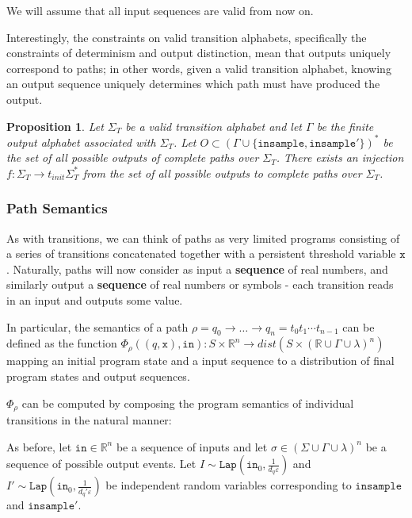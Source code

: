 \documentclass[12pt]{article}
\newcommand{\RR}{\mathbb{R}}
\newcommand{\Lap}{\texttt{Lap}}
\newtheorem{prop}[thm]{Proposition}
\theoremstyle{definition}
\begin{document}
We will assume that all input sequences are valid from now on. 

Interestingly, the constraints on valid transition alphabets, specifically the constraints of determinism and output distinction, mean that outputs uniquely correspond to paths; in other words, given a valid transition alphabet, knowing an output sequence uniquely determines which path must have produced the output. 

\begin{prop}
    Let $\Sigma_T$ be a valid transition alphabet and let $\Gamma$ be the finite output alphabet associated with $\Sigma_T$. Let $O\subset (\Gamma\cup\{\texttt{insample}, \texttt{insample}'\})^*$ be the set of all possible outputs of complete paths over $\Sigma_T$. There exists an injection $f: \Sigma_T\to t_{init}\Sigma_T^*$ from the set of all possible outputs to complete paths over $\Sigma_T$. 
\end{prop}

\subsubsection{Path Semantics}

As with transitions, we can think of paths as very limited programs consisting of a series of transitions concatenated together with a persistent threshold variable $\texttt{x}$. Naturally, paths will now consider as input a \textbf{sequence} of real numbers, and similarly output a \textbf{sequence} of real numbers or symbols - each transition reads in an input and outputs some value.

In particular, the semantics of a path $\rho = q_0\to \ldots \to q_n = t_0t_1\cdots t_{n-1}$ can be defined as the function $\Phi_{\rho}((q, \texttt{x}), \texttt{in}): S\times \RR^n\to dist(S\times (\RR\cup\Gamma\cup\lambda)^n)$ mapping an initial program state and a input sequence to a distribution of final program states and output sequences. 

$\Phi_{\rho}$ can be computed by composing the program semantics of individual transitions in the natural manner:

As before, let $\texttt{in}\in \RR^n$ be a sequence of inputs and let $\sigma \in (\Sigma\cup\Gamma\cup\lambda)^n$ be a sequence of possible output events.
Let $I\sim \Lap(\texttt{in}_0, \frac{1}{d_q\varepsilon})$ and $I'\sim \Lap(\texttt{in}_0, \frac{1}{d_q'\varepsilon})$ be independent random variables corresponding to $\texttt{insample}$ and $\texttt{insample}'$. 
\end{document}
